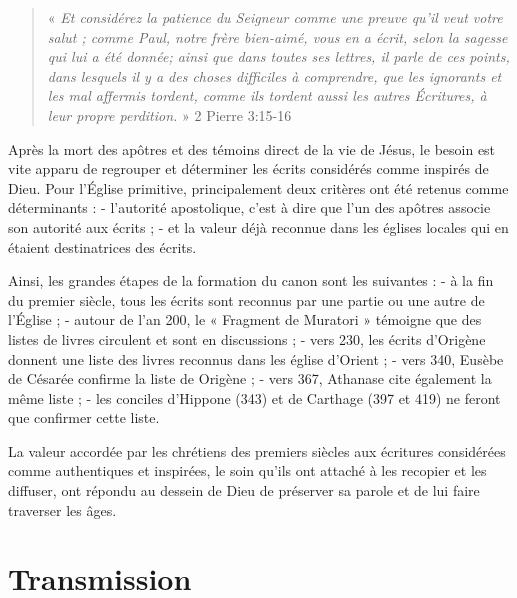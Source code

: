 \begin{small}
\begin{quote}
« \emph{Et considérez la patience du Seigneur comme une preuve qu'il veut votre salut ; comme Paul, notre frère bien-aimé, vous en a écrit, selon la sagesse qui lui a été donnée; ainsi que dans toutes ses lettres, il parle de ces points, dans lesquels il y a des choses difficiles à comprendre, que les ignorants et les mal affermis tordent, comme ils tordent aussi les autres Écritures, à leur propre perdition.} » 2 Pierre 3:15-16
\end{quote}

Après la mort des apôtres et des témoins direct de la vie de Jésus, le besoin est vite apparu de regrouper et déterminer les écrits considérés comme inspirés de Dieu. Pour l'Église primitive, principalement deux critères ont été retenus comme déterminants :\newline
- l'autorité apostolique, c'est à dire que l'un des apôtres associe son autorité aux écrits ;\newline
- et la valeur déjà reconnue dans les églises locales qui en étaient destinatrices des écrits.\bigskip

Ainsi, les grandes étapes de la formation du canon sont les suivantes :\newline
- à la fin du premier siècle, tous les écrits sont reconnus par une partie ou une autre de l'Église ;\newline
- autour de l'an 200, le « Fragment de Muratori » témoigne que des listes de livres circulent et sont en discussions ;\newline
- vers 230, les écrits d'Origène donnent une liste des livres reconnus dans les église d'Orient ;\newline
- vers 340, Eusèbe de Césarée confirme la liste de Origène ;\newline
- vers 367, Athanase cite également la même liste ;\newline
- les conciles d'Hippone (343) et de Carthage (397 et 419) ne feront que confirmer cette liste.\bigskip

La valeur accordée par les chrétiens des premiers siècles aux écritures considérées comme authentiques et inspirées, le soin qu'ils ont attaché à les recopier et les diffuser, ont répondu au dessein de Dieu de préserver sa parole et de lui faire traverser les âges.

\section*{Transmission}


\end{small}
